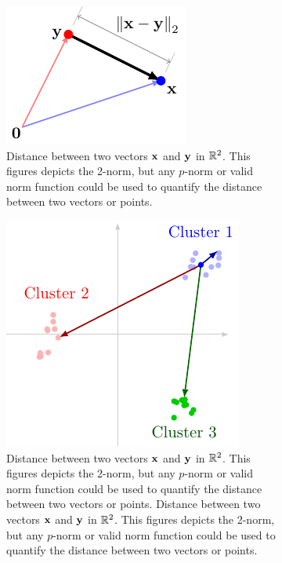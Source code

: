\begin{figure}[h]
    \centering
    \begin{subfigure}[b]{0.35\textwidth}
        \includegraphics[width=0.95\linewidth]{figure/chapter01/dist-demo.pdf}
        \caption{Distance between two vectors $\mathbf{x}$ and $\mathbf{y}$ in $\mathbb{R}^2$. This figures depicts the 2-norm, but any $p$-norm or valid norm function could be used to quantify the distance between two vectors or points.}
        \label{fig:dist1}
    \end{subfigure}
    \hspace{0.05\textwidth}
    \begin{subfigure}[b]{0.4\textwidth}
        \centering
        \includegraphics[width=0.85\linewidth]{figure/chapter01/cluster-dist.pdf}
        \caption{Distance between two vectors $\mathbf{x}$ and $\mathbf{y}$ in $\mathbb{R}^2$. This figures depicts the 2-norm, but any $p$-norm or valid norm function could be used to quantify the distance between two vectors or points. Distance between two vectors $\mathbf{x}$ and $\mathbf{y}$ in $\mathbb{R}^2$. This figures depicts the 2-norm, but any $p$-norm or valid norm function could be used to quantify the distance between two vectors or points.}
        \label{fig:dist2}
    \end{subfigure}
    \caption{}
\end{figure}

